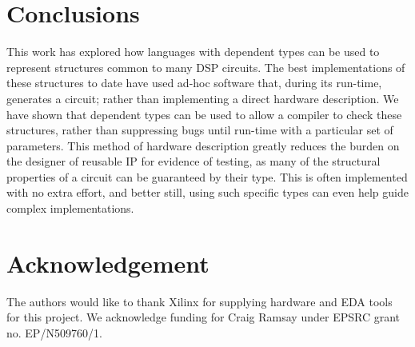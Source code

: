 \documentclass[conference]{IEEEtran}
\begin{document}
\section{Conclusions}

This work has explored how languages with dependent types can be used to
represent structures common to many DSP circuits. The best implementations of
these structures to date have used ad-hoc software that, during its run-time,
generates a circuit; rather than implementing a direct hardware description. We
have shown that dependent types can be used to allow a compiler to check these
structures, rather than suppressing bugs until run-time with a particular set of
parameters. This method of hardware description greatly reduces the burden on
the designer of reusable IP for evidence of testing, as many of the structural
properties of a circuit can be guaranteed by their type. This is often
implemented with no extra effort, and better still, using such specific types
can even help guide complex implementations.

\section*{Acknowledgement}

The authors would like to thank Xilinx for supplying hardware and EDA tools for
this project. We acknowledge funding for Craig Ramsay under EPSRC grant no.
EP/N509760/1.


 
\end{document}
